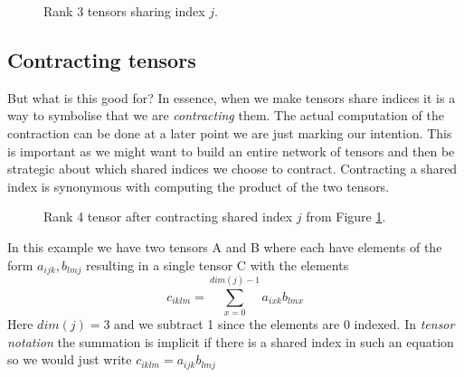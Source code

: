 \begin{figure}[H]
    \centering 
    \caption{Rank 3 tensors sharing index $j$.}
    \label{fig:2r3t}
\end{figure}
\subsection{Contracting tensors }
\noindent
But what is this good for? In essence, when we make tensors share indices it is a way to symbolise that we are \textit{contracting} them. The actual computation of the contraction can be done at a later point we are just marking our intention. This is important as we might want to build an entire network of tensors and then be strategic about which shared indices we choose to contract. Contracting a shared index is synonymous with computing the product of the two tensors. 
\begin{figure}[H]
    \centering 
    \caption{Rank 4 tensor after contracting shared index $j$ from Figure \ref{fig:2r3t}.}
    \label{fig:4t}
\end{figure}
\noindent
In this example we have two tensors A and B where each have elements of the form $a_{ijk}, b_{lmj}$ resulting in a single tensor C with the elements $$c_{iklm}=\displaystyle\sum_{x=0}^{dim(j)-1} a_{ixk}b_{lmx} $$
Here $dim(j)=3$ and we subtract 1 since the elements are 0 indexed. In \textit{tensor notation} the summation is implicit if there is a shared index in such an equation so we would just write $c_{iklm}=a_{ijk}b_{lmj}$

